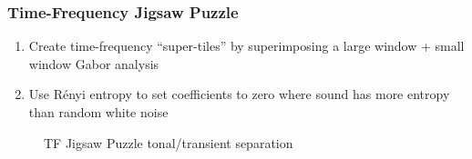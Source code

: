 \documentclass{beamer}
\begin{document}
\begin{frame}
	\frametitle{Time-Frequency Jigsaw Puzzle}
	\begin{enumerate}
		\item
			Create time-frequency ``super-tiles'' by superimposing a large window + small window Gabor analysis
		\item
			Use R{\'e}nyi entropy to set coefficients to zero where sound has more entropy than random white noise
	\end{enumerate}
	\begin{figure}[ht]
		\vspace{-0.75em}
		\hspace{0.1em}
		\caption{TF Jigsaw Puzzle tonal/transient separation}
	\end{figure}
\end{frame}

\end{document}

